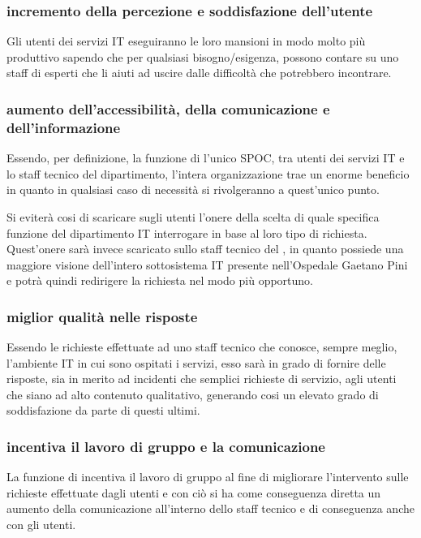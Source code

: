 \subsubsection[Incremento della percezione e soddisfazione dell'utente]{incremento della percezione e soddisfazione dell'utente}
Gli utenti dei servizi \acs{IT} eseguiranno le loro mansioni in modo molto più produttivo sapendo che per qualsiasi bisogno/esigenza, possono contare su uno staff di esperti che li aiuti ad uscire dalle difficoltà che potrebbero incontrare.

\subsubsection[Aumento dell'accessibilità, della comunicazione e dell'informazione]{aumento dell'accessibilità, della comunicazione e dell'informazione}
Essendo, per definizione, la funzione di  l'unico \ac{SPOC}, tra utenti dei servizi \acs{IT} e lo staff tecnico del dipartimento, l'intera organizzazione trae un enorme beneficio in quanto in qualsiasi caso di necessità si rivolgeranno a quest'unico punto.

Si eviterà cosi di scaricare sugli utenti l'onere della scelta di quale specifica funzione del dipartimento \acs{IT} interrogare in base al loro tipo di richiesta. Quest'onere sarà invece scaricato sullo staff tecnico del , in quanto possiede una maggiore visione dell'intero sottosistema \acs{IT} presente nell'Ospedale Gaetano Pini e potrà quindi redirigere la richiesta nel modo più opportuno.

\subsubsection[Miglior qualità nelle risposte]{miglior qualità nelle risposte}
Essendo le richieste effettuate ad uno staff tecnico che conosce, sempre meglio, l'ambiente \acs{IT} in cui sono ospitati i servizi, esso sarà in grado di fornire delle risposte, sia in merito ad incidenti che semplici richieste di servizio, agli utenti che siano ad alto contenuto qualitativo, generando cosi un elevato grado di soddisfazione da parte di questi ultimi.

\subsubsection[Incentiva il lavoro di gruppo e la comunicazione]{incentiva il lavoro di gruppo e la comunicazione}
La funzione di  incentiva il lavoro di gruppo al fine di migliorare l'intervento sulle richieste effettuate dagli utenti e con ciò si ha come conseguenza diretta un aumento della comunicazione all'interno dello staff tecnico e di conseguenza anche con gli utenti.

